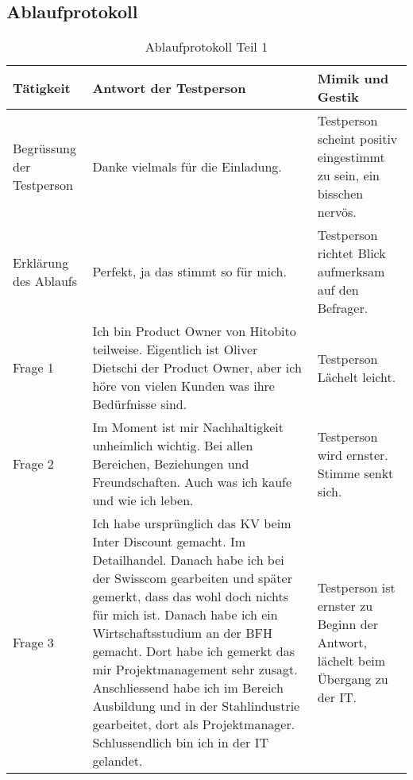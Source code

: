 \subsection{Ablaufprotokoll}
\begin{table}[h!]
   \begin{tabular}{|L{0.2\textwidth}|L{0.4\textwidth}|L{0.3\textwidth}|}
       \hline
       \color{white}Tätigkeit & \color{white} Antwort der Testperson & \color{white} Mimik und Gestik \\
       \hline
       Begrüssung der Testperson & Danke vielmals für die Einladung. & Testperson scheint positiv eingestimmt zu sein, ein bisschen nervös. \\
       \hline
       Erklärung des Ablaufs & Perfekt, ja das stimmt so für mich. & Testperson richtet Blick aufmerksam auf den Befrager. \\
       \hline
       Frage 1 & Ich bin Product Owner von Hitobito teilweise. Eigentlich ist Oliver Dietschi der Product Owner, aber ich höre von vielen Kunden was ihre Bedürfnisse sind. & Testperson Lächelt leicht. \\
       \hline
       Frage 2 & Im Moment ist mir Nachhaltigkeit unheimlich wichtig. Bei allen Bereichen, Beziehungen und Freundschaften. Auch was ich kaufe und wie ich leben. & Testperson wird ernster. Stimme senkt sich. \\
       \hline
       Frage 3 & Ich habe ursprünglich das KV beim Inter Discount gemacht. Im Detailhandel. Danach habe ich bei der Swisscom gearbeiten und später gemerkt, dass das wohl doch nichts für mich ist. Danach habe ich ein
       Wirtschaftsstudium an der BFH gemacht. Dort habe ich gemerkt das mir Projektmanagement sehr zusagt. Anschliessend habe ich im Bereich Ausbildung und in der Stahlindustrie gearbeitet, dort als Projektmanager.
       Schlussendlich bin ich in der IT gelandet. & Testperson ist ernster zu Beginn der Antwort, lächelt beim Übergang zu der IT.   \\
       \hline
     \end{tabular}
     \caption{Ablaufprotokoll Teil 1}
\end{table}

\newpage

